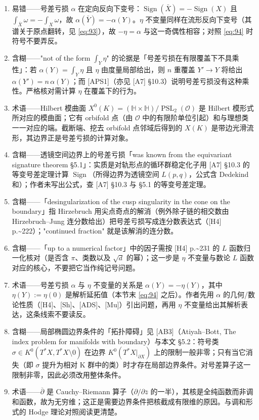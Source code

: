 \documentclass[11pt]{amsart}
\theoremstyle{definition}
\theoremstyle{remark}
\theoremstyle{plain}
\numberwithin{equation}{section}
\renewcommand{\:}{\colon}
\newcommand{\HH}{{\mathbb H}}
\newcommand{\dbar}{{\overline\partial}}
\DeclareMathOperator{\PSL}{PSL}
\DeclareMathOperator{\Sign}{Sign}
\newcommand{\bX}{\partial X}
\newcommand{\sO}{\mathcal{O}}
\begin{document}
\begin{enumerate}[leftmargin=2.2em,itemsep=2pt,topsep=2pt]
  \item 易错——号差亏损 $\alpha$ 在定向反向下变号：$\Sign(\bar X)=-\Sign(X)$ 且 $\int_{\bar X}\omega=-\int_X\omega$，故 $\alpha(\bar Y)=-\alpha(Y)$。$\eta$ 不变量同样在流形反向下变号（其谱关于原点翻转，见 \eqref{eq:93}），故 $-\eta=\alpha$ 与这一奇偶性相容；对照 \eqref{eq:94} 时符号不要弄反。
  \item 含糊——"not of the form $\int_Y\eta$" 的论据是「号差亏损在有限覆盖下不具乘性」：若 $\alpha(Y)=\int_Y\eta$ 且 $\eta$ 由度量局部给出，则 $n$ 重覆盖 $Y'\to Y$ 将给出 $\alpha(Y')=n\,\alpha(Y)$；而 [APS1]（亦见 [A7] §10.3）说明号差亏损没有这种乘性。严格核对需计算 $\eta$ 在覆盖下的行为。
  \item 术语——Hilbert 模曲面 $X^0(K)=(\HH\times\HH)/\PSL_2(\sO)$ 是 Hilbert 模形式所对应的模曲面；它有 orbifold 点（由 $\sO$ 中的有限阶单位引起）和与理想类一一对应的端。截断端、挖去 orbifold 点邻域后得到的 $X(K)$ 是带边光滑流形，其边界正是号差亏损的计算对象。
  \item 含糊——透镜空间边界上的号差亏损「was known from the equivariant signature theorem §5.1」：实质是对轨形点的循环群稳定化子用 [A7] §10.3 的等变号差定理计算 $\Sign$（所得边界为透镜空间 $L(p,q)$，公式含 Dedekind 和）；作者未写出公式，查 [A7] §10.3 与 §5.1 的等变号差定理。
  \item 含糊——「desingularization of the cusp singularity in the cone on the boundary」指 Hirzebruch 用尖点奇点的解消（例外除子链的相交数由 Hirzebruch–Jung 连分数给出）把号差亏损写成连分数表达式（[H4] p.\textasciitilde{}222）；"continued fraction" 就是该解消的连分数。
  \item 含糊——「up to a numerical factor」中的因子需按 [H4] p.\textasciitilde{}231 的 $L$ 函数归一化核对（是否含 $\pi$、类数以及 $\sqrt d$ 的幂）；这一步是 $\eta$ 不变量与数论 $L$ 函数对应的核心，不要把它当作纯记号问题。
  \item 术语——号差亏损 $\alpha$ 与 $\eta$ 不变量的关系是 $\alpha(Y)=-\eta(Y)$，其中 $\eta(Y):=\eta(0)$ 是解析延拓值（本节末 \eqref{eq:94} 之后）。作者先用 $\alpha$ 的几何/数论性质（[H4]、[Sh]、[ADS]、[Mu]）引出问题，再用 $\eta$ 不变量给出其解析表达，这条线索不要读反。
  \item 含糊——局部椭圆边界条件的「拓扑障碍」见 [AB3]（Atiyah–Bott, The index problem for manifolds with boundary）与本文 §5.2：符号类 $\sigma\in K^0(T^*X,T^*X\setminus0)$ 在边界 $K^0(T^*X|_{\bX})$ 上的限制一般非零；只有当它消失（即 $\sigma$ 提升为相对 K 群中的类）时才存在局部边界条件。对号差算子这一限制非零，因此必须改用整体条件。
  \item 术语——$\dbar$ 是 Cauchy–Riemann 算子（$\partial/\partial\bar z$ 的一半），其核是全纯函数而非调和函数，故为无穷维；这正是需要边界条件把核截成有限维的原因。与调和形式的 Hodge 理论对照阅读更清楚。

\end{enumerate}
\end{document}
